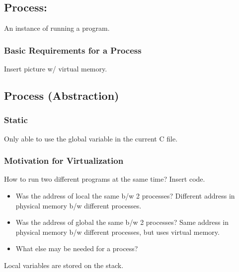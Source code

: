 \subsection{Process:}
\begin{definition}
    An instance of running a program.
\end{definition}

\subsubsection{Basic Requirements for a Process}
\begin{definition}
    Insert picture w/ virtual memory. 
\end{definition}

\subsection{Process (Abstraction)}

\subsubsection{Static}
\begin{definition}
    Only able to use the global variable in the current C file.     
\end{definition}

\subsubsection{Motivation for Virtualization}
\begin{motivation}
    How to run two different programs at the same time?
        Insert code. 
        \begin{itemize}
            \item Was the address of local the same b/w 2 processes? Different address in physical memory b/w different processes.
            \item Was the address of global the same b/w 2 processes? Same address in physical memory b/w different processes, but uses virtual memory.
            \item What else may be needed for a process?  
        \end{itemize}
\end{motivation}

\begin{warning}
    Local variables are stored on the stack. 
\end{warning}

